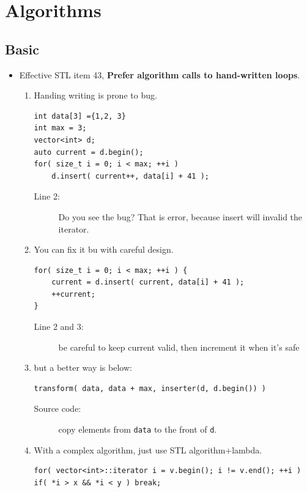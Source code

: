 \documentclass[a4paper,11pt,twoside]{book}
\begin{document}
\section{Algorithms}

\subsection{Basic}

\begin{itemize}

\item Effective STL item 43, \textbf{Prefer algorithm calls to hand-written loops}.
\begin{enumerate}
\item  Handing writing is prone to bug.

\begin{lstlisting}
int data[3] ={1,2, 3}
int max = 3;
vector<int> d;
auto current = d.begin();
for( size_t i = 0; i < max; ++i )
	d.insert( current++, data[i] + 41 ); 
\end{lstlisting}
\begin{description}
	\item[Line 2:] Do you see the bug? That is error, because insert will invalid the iterator.
\end{description}

\item You can fix it bu with careful design.
\begin{lstlisting}
for( size_t i = 0; i < max; ++i ) {
	current = d.insert( current, data[i] + 41 ); 
	++current;    
}
\end{lstlisting}
\begin{description}
	\item[Line 2 and 3:] be careful to keep current valid, then increment it when it's safe
\end{description}

\item but a better way is below:
\begin{lstlisting}[numbers=none]
transform( data, data + max, inserter(d, d.begin()) )
\end{lstlisting}
\begin{description}
	\item[Source code:] copy elements from \texttt{data} to the front of \texttt{d}.
\end{description}

\item With a complex algorithm, just use STL algorithm+lambda. 
\begin{lstlisting}[numbers=none]
for( vector<int>::iterator i = v.begin(); i != v.end(); ++i )
if( *i > x && *i < y ) break;


\end{lstlisting}
\end{enumerate}
\end{itemize}
\end{document}
